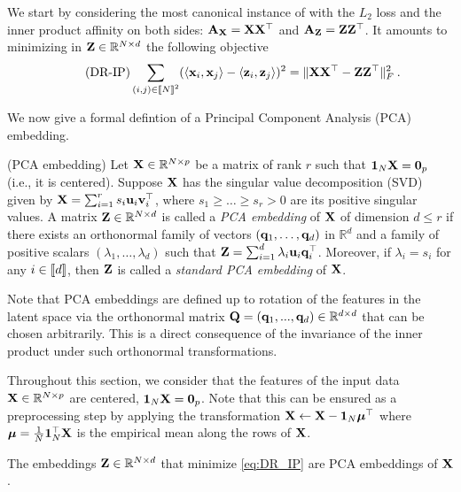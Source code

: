 We start by considering the most canonical instance of  with the $L_2$ loss and the inner product affinity on both sides: ${\mathbf{A}}_{{\mathbf{X}}} = {\mathbf{X}} {\mathbf{X}}^\top$ and ${\mathbf{A}}_{{\mathbf{Z}}} = {\mathbf{Z}} {\mathbf{Z}}^\top$. It amounts to minimizing in ${\mathbf{Z}} \in \mathbb{R}^{N \times d}$ the following objective
\begin{equation*}\label{eq:DR_IP}\tag{DR-IP}
	\sum_{(i,j) \in {[\![N]\!]}^2} (\langle {\mathbf{x}}_i, {\mathbf{x}}_j \rangle - \langle {\mathbf{z}}_i, {\mathbf{z}}_j \rangle)^2 = \| {\mathbf{X}} {\mathbf{X}}^\top - {\mathbf{Z}} {\mathbf{Z}}^\top \|_F^2 \:.
\end{equation*}

We now give a formal defintion of a Principal Component Analysis (PCA) embedding.

\begin{definition}{(PCA embedding)}\label{def:PCA_embedding}
	Let ${\mathbf{X}} \in \mathbb{R}^{N \times p}$ be a matrix of rank $r$ such that $\mathbf{1}_N {\mathbf{X}} = \mathbf{0}_p$ (i.e., it is centered). Suppose ${\mathbf{X}}$ has the singular value decomposition (SVD) given by ${\mathbf{X}} = \sum_{i=1}^{r} s_i {\mathbf{u}}_i {\mathbf{v}}_i^\top$, where $s_1 \geq \dots \geq s_r > 0$ are its positive singular values. A matrix ${\mathbf{Z}} \in \mathbb{R}^{N \times d}$ is called a \emph{PCA embedding} of ${\mathbf{X}}$ of dimension $d \leq r$ if there exists an orthonormal family of vectors $({\mathbf{q}}_1, \dots, {\mathbf{q}}_d)$ in $\mathbb{R}^d$ and a family of positive scalars $(\lambda_1, \dots, \lambda_d)$ such that ${\mathbf{Z}} = \sum_{i=1}^{d} \lambda_i {\mathbf{u}}_i {\mathbf{q}}_i^\top$. Moreover, if $\lambda_i = s_i$ for any $i \in {[\![d]\!]}$, then ${\mathbf{Z}}$ is called a \emph{standard PCA embedding} of ${\mathbf{X}}$.
\end{definition}
	
\begin{remark}
	Note that PCA embeddings are defined up to rotation of the features in the latent space via the orthonormal matrix ${\mathbf{Q}} = ({\mathbf{q}}_1, ..., {\mathbf{q}}_d) \in \mathbb{R}^{d \times d}$ that can be chosen arbitrarily. This is a direct consequence of the invariance of the inner product under such orthonormal transformations.
\end{remark}

Throughout this section, we consider that the features of the input data ${\mathbf{X}} \in \mathbb{R}^{N \times p}$ are centered, \ie $\bm{1}_N {\mathbf{X}} = \bm{0}_p$. Note that this can be ensured as a preprocessing step by applying the transformation ${\mathbf{X}} \leftarrow {\mathbf{X}} - \bm{1}_N \bm{\mu}^\top$ where $\bm{\mu} = \frac{1}{N} \bm{1}_N^\top {\mathbf{X}}$ is the empirical mean along the rows of ${\mathbf{X}}$.

\begin{proposition}\label{prop:PCA_embedding}
    The embeddings ${\mathbf{Z}} \in \mathbb{R}^{N \times d}$ that minimize \ref{eq:DR_IP} are PCA embeddings of ${\mathbf{X}}$.
\end{proposition}

